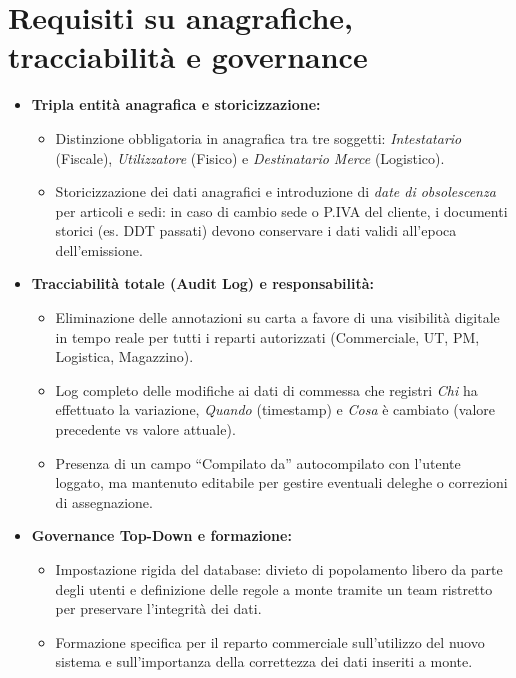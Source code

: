\section{Requisiti su anagrafiche, tracciabilità e governance}
\begin{itemize}
      \item \textbf{Tripla entità anagrafica e storicizzazione:}
            \begin{itemize}
                  \item Distinzione obbligatoria in anagrafica tra tre soggetti: \textit{Intestatario} (Fiscale),
                        \textit{Utilizzatore} (Fisico) e \textit{Destinatario Merce} (Logistico).
                  \item Storicizzazione dei dati anagrafici e introduzione di \textit{date di obsolescenza} per articoli
                        e sedi: in caso di cambio sede o P.IVA del cliente, i documenti storici (es. DDT passati) devono conservare
                        i dati validi all'epoca dell'emissione.
            \end{itemize}
      \item \textbf{Tracciabilità totale (Audit Log) e responsabilità:}
            \begin{itemize}
                  \item Eliminazione delle annotazioni su carta a favore di una visibilità digitale in tempo reale per tutti i
                        reparti autorizzati (Commerciale, \ac{UT}, \ac{PM}, Logistica, Magazzino).
                  \item Log completo delle modifiche ai dati di commessa che registri \textit{Chi} ha effettuato la variazione,
                        \textit{Quando} (timestamp) e \textit{Cosa} è cambiato (valore precedente vs valore attuale).
                  \item Presenza di un campo ``Compilato da'' autocompilato con l'utente loggato, ma mantenuto editabile
                        per gestire eventuali deleghe o correzioni di assegnazione.
            \end{itemize}
      \item \textbf{Governance Top-Down e formazione:}
            \begin{itemize}
                  \item Impostazione rigida del database: divieto di popolamento libero da parte degli utenti e definizione
                        delle regole a monte tramite un team ristretto per preservare l'integrità dei dati.
                  \item Formazione specifica per il reparto commerciale sull'utilizzo del nuovo sistema e sull'importanza
                        della correttezza dei dati inseriti a monte.
            \end{itemize}
\end{itemize}